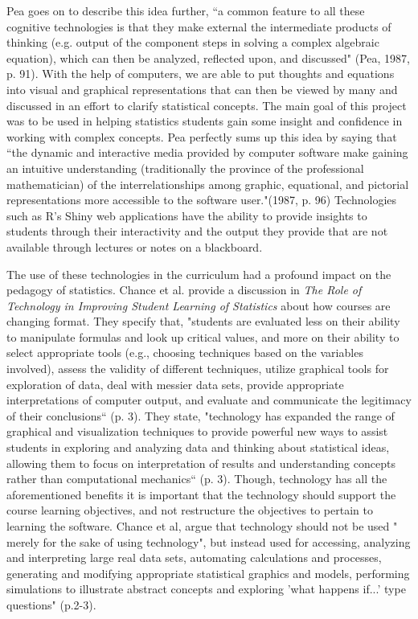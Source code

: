 \documentclass[11pt]{book}
\begin{document}
	  Pea goes on to describe this idea further,  ``a common feature to all these cognitive technologies is that they make external the intermediate products of thinking (e.g. output of the component steps in solving a complex algebraic equation), which can then be analyzed, reflected upon, and discussed" (Pea, 1987, p. 91).  With the help of computers, we are able to put thoughts and equations into visual and graphical representations that can then be viewed by many and discussed in an effort to clarify statistical concepts.  The main goal of this project was to be used in helping statistics students gain some insight and confidence in working with complex concepts.  Pea perfectly sums up this idea by saying that ``the dynamic and interactive media provided by computer software make gaining an intuitive understanding (traditionally the province of the professional mathematician) of the interrelationships among graphic, equational, and pictorial representations more accessible to the software user."(1987, p. 96)  Technologies such as R's Shiny web applications have the ability to provide insights to students through their interactivity and the output they provide that are not available through lectures or notes on a blackboard.
	 

The use of these technologies in the curriculum had a profound impact on the pedagogy of statistics. Chance et al. provide a discussion in  \emph{The Role of Technology in Improving Student Learning of Statistics} about how courses are changing format.  They specify that, "students are evaluated less on their ability to manipulate formulas and look up critical values, and more on their ability to select appropriate tools (e.g., choosing techniques based on the variables involved), assess the validity of different techniques, utilize graphical tools for exploration of data, deal with messier data sets, provide appropriate interpretations of computer output, and evaluate and communicate the legitimacy of their conclusions`` (p. 3).  They state, "technology has expanded the range of graphical and visualization techniques to provide powerful new ways to assist students in exploring and analyzing data and thinking about statistical ideas, allowing them to focus on interpretation of results and understanding concepts rather than computational mechanics`` (p. 3).    Though, technology has all the aforementioned benefits it is important that the technology should support the course learning objectives, and not restructure the objectives to pertain to learning the software.  Chance et al, argue that technology should not be used " merely for the sake of using technology",  but instead used for accessing, analyzing and interpreting large real data sets, automating calculations and processes, generating and modifying appropriate statistical graphics and models, performing simulations to illustrate abstract concepts and exploring 'what happens if...' type questions" (p.2-3).
\end{document}
